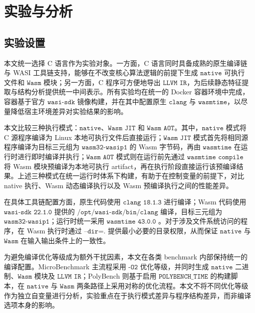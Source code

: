 \chapter{实验与分析}
\label{cha:experiment}



\section{实验设置}

本文统一选择 C 语言作为实验对象。一方面，C 语言同时具备成熟的原生编译链与 WASI 工具链支持，能够在不改变核心算法逻辑的前提下生成 $\texttt{native}$ 可执行文件和 $\texttt{Wasm}$ 模块；另一方面，C 程序可方便地导出 $\texttt{LLVM IR}$，为后续静态特征提取与结构分析提供统一中间表示。所有实验均在统一的 Docker 容器环境中完成，容器基于官方 $\texttt{wasi-sdk}$ 镜像构建，并在其中配置原生 $\texttt{clang}$ 与 $\texttt{wasmtime}$，以尽量降低宿主环境差异对实验结果的影响。

本文比较三种执行模式：$\texttt{native}$、$\texttt{Wasm JIT}$ 和 $\texttt{Wasm AOT}$。其中，$\texttt{native}$ 模式将 C 源程序编译为 Linux 本地可执行文件后直接运行；$\texttt{Wasm JIT}$ 模式首先将相同源程序编译为目标三元组为 $\texttt{wasm32-wasip1}$ 的 Wasm 字节码，再由 $\texttt{wasmtime}$ 在运行时进行即时编译并执行；$\texttt{Wasm AOT}$ 模式则在运行前先通过 $\texttt{wasmtime compile}$ 将 Wasm 模块预编译为本地可执行 artifact，再在执行阶段直接运行该预编译结果。上述三种模式在统一运行时体系下构建，有助于在控制变量的前提下，对比 native 执行、Wasm 动态编译执行以及 Wasm 预编译执行之间的性能差异。

在具体工具链配置方面，原生代码使用 $\texttt{clang 18.1.3}$ \cite{clang} 进行编译；Wasm 代码使用 $\texttt{wasi-sdk 22.1.0}$ \cite{wasi-sdk} 提供的 $\texttt{/opt/wasi-sdk/bin/clang}$ 编译，目标三元组为 $\texttt{wasm32-wasip1}$；运行时统一采用 $\texttt{wasmtime 43.0.0}$ \cite{wasmtime}。对于涉及文件系统访问的程序，在 Wasm 执行时通过 $\texttt{--dir=.}$ 提供最小必要的目录权限，从而保证 $\texttt{native}$ 与 $\texttt{Wasm}$ 在输入输出条件上的一致性。

为避免编译优化等级成为额外干扰因素，本文在各类 benchmark 内部保持统一的编译配置。MicroBenchmark 主流程采用 $\texttt{-O2}$ 优化等级，并同时生成 $\texttt{native}$ 二进制、$\texttt{Wasm}$ 模块及 $\texttt{LLVM IR}$；PolyBench 则基于启用 $\texttt{POLYBENCH\_TIME}$ 的构建脚本，在 $\texttt{native}$ 与 $\texttt{Wasm}$ 两条路径上采用对称的优化流程。本文不将不同优化等级作为独立自变量进行分析，实验重点在于执行模式差异与程序结构差异，而非编译选项本身的影响。


